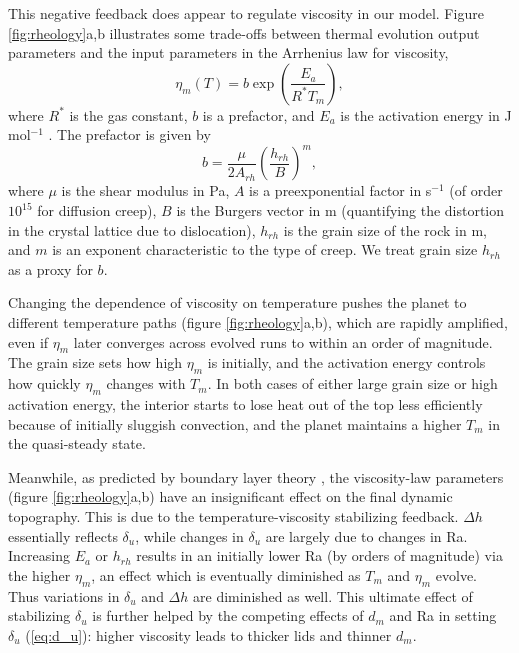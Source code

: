This negative feedback does appear to regulate viscosity in our model. Figure \ref{fig:rheology}a,b illustrates some trade-offs between thermal evolution output parameters and the input parameters in the Arrhenius law for viscosity,
\begin{equation}\label{eq:eta_Arrhenius}
\eta_m(T) = b \exp\left(\frac{E_a}{R^* T_m}\right),
\end{equation}
where $R^*$ is the gas constant, $b$ is a prefactor, and $E_a$ is the activation energy in J mol$^{-1}$ \citep{Karato1993}. The prefactor is given by
\begin{equation}\label{eq:eta_b}
b = \frac{\mu}{2 A_{rh}} \left(\frac{h_{rh}}{B}\right)^m,
\end{equation}
where $\mu$ is the shear modulus in Pa, $A$ is a preexponential factor in s$^{-1}$ (of order $10^{15}$ for diffusion creep), $B$ is the Burgers vector in m (quantifying the distortion in the crystal lattice due to dislocation), $h_{rh}$ is the grain size of the rock in m, and $m$ is an exponent characteristic to the type of creep. We treat grain size $h_{rh}$ as a proxy for $b$.

Changing the dependence of viscosity on temperature pushes the planet to different temperature paths (figure \ref{fig:rheology}a,b), which are rapidly amplified, even if $\eta_m$ later converges across evolved runs to within an order of magnitude. The grain size sets how high $\eta_m$ is initially, and the activation energy controls how quickly $\eta_m$ changes with $T_m$. In both cases of either large grain size or high activation energy, the interior starts to lose heat out of the top less efficiently because of initially sluggish convection, and the planet maintains a higher $T_m$ in the quasi-steady state. 

Meanwhile, as predicted by boundary layer theory \citep{Solomatov1995, Solomatov2000, Reese2005}, the viscosity-law parameters (figure \ref{fig:rheology}a,b) have an insignificant effect on the final dynamic topography. This is due to the temperature-viscosity stabilizing feedback. $\Delta h$ essentially reflects $\delta_u$, while changes in $\delta_u$ are largely due to changes in Ra. Increasing $E_a$ or $h_{rh}$ results in an initially lower Ra (by orders of magnitude) via the higher $\eta_m$, an effect which is eventually diminished as $T_m$ and $\eta_m$ evolve. Thus variations in $\delta_u$ and $\Delta h$ are diminished as well. This ultimate effect of stabilizing $\delta_u$ is further helped by the competing effects of $d_m$ and Ra in setting $\delta_u$ (\ref{eq:d_u}): higher viscosity leads to thicker lids and thinner $d_m$.

